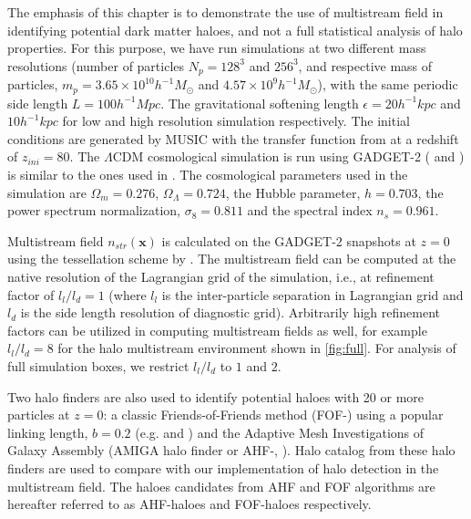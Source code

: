 The emphasis of this chapter is to demonstrate the use of multistream field in identifying potential dark matter haloes, and not a full statistical analysis of halo properties. For this purpose, we have run simulations at two different mass resolutions (number of particles $N_p = 128^3$ and $256^3$, and respective mass of particles, $m_p = 3.65 \times 10^{10} h^{-1} M_{\odot}$ and $ 4.57 \times 10^{9} h^{-1} M_{\odot}$), with the same periodic side length $L = 100 h^{-1} Mpc$. The gravitational softening length $\epsilon = 20 h^{-1} kpc$ and $10 h^{-1} kpc$ for low and high resolution simulation respectively. The initial conditions are generated by {MUSIC} \citep{Hahn2011a} with the transfer function from \cite{Eisenstein1998a} at a redshift of $z_{ini}= 80$. The $\Lambda$CDM cosmological simulation is run using {GADGET-2} (\citealt{Springel2005c} and \citealt{Springel2001}) is similar to the ones used in \cite{Ramachandra2017}. The cosmological parameters used in the simulation are $\Omega_{m}= 0.276$, $\Omega_{\Lambda}= 0.724$, the Hubble parameter, $h = 0.703$, the power spectrum normalization, $\sigma_8 = 0.811$ and the spectral index $n_s= 0.961$. 



Multistream field $n_{str}(\mathbf{x})$ is calculated on the GADGET-2 snapshots at $z=0$ using the tessellation scheme by \cite{Shandarin2012}. The multistream field can be computed at the native resolution of the Lagrangian grid of the simulation, i.e., at refinement factor of $l_l/l_d = 1$ (where $l_l$ is the inter-particle separation in Lagrangian grid and $l_d$ is the side length resolution of diagnostic grid). Arbitrarily high refinement factors can be utilized in computing multistream fields as well, for example  $l_l/l_d = 8$ for the halo multistream environment shown in \autoref{fig:full}. For analysis of full simulation boxes, we restrict $l_l/l_d$ to $1$ and $2$. 

Two halo finders are also used to identify potential haloes with 20 or more particles at $z= 0$: a classic Friends-of-Friends method (FOF-\citealt{Davis1985}) using a popular linking length, $ b= 0.2$ (e.g. \citealt{Frenk1988} and \citealt{Lacey1994}) and the Adaptive Mesh Investigations of Galaxy Assembly (AMIGA halo finder or AHF-\citealt{Knollmann2009a}, \citealt{Gill2004a}). Halo catalog from these halo finders are used to compare with our implementation of halo detection in the multistream field. The haloes candidates from AHF and FOF algorithms are hereafter referred to as AHF-haloes and FOF-haloes respectively.




